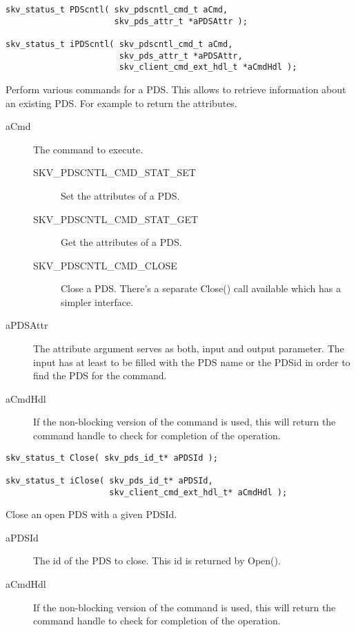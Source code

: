 \begin{lstlisting}
skv_status_t PDScntl( skv_pdscntl_cmd_t aCmd,
                      skv_pds_attr_t *aPDSAttr );

skv_status_t iPDScntl( skv_pdscntl_cmd_t aCmd,
                       skv_pds_attr_t *aPDSAttr,
                       skv_client_cmd_ext_hdl_t *aCmdHdl );
\end{lstlisting}

Perform various commands for a PDS.  This allows to retrieve
information about an existing PDS.  For example to return the
attributes.
\begin{description}
\item[aCmd] The command to execute.
  \begin{description}
    \item[\tiny SKV\_PDSCNTL\_CMD\_STAT\_SET] Set the attributes of a
      PDS.
    \item[\tiny SKV\_PDSCNTL\_CMD\_STAT\_GET] Get the attributes of a
      PDS.
    \item[\tiny SKV\_PDSCNTL\_CMD\_CLOSE] Close a PDS.  There's a
      separate Close() call available which has a simpler interface.
  \end{description}

\item[aPDSAttr] The attribute argument serves as both, input and
  output parameter.  The input has at least to be filled with the PDS
  name or the PDSid in order to find the PDS for the command.

\item[aCmdHdl] If the non-blocking version of the command is used,
  this will return the command handle to check for completion of the
  operation.
\end{description}


\begin{lstlisting}
skv_status_t Close( skv_pds_id_t* aPDSId );

skv_status_t iClose( skv_pds_id_t* aPDSId,
                     skv_client_cmd_ext_hdl_t* aCmdHdl );
\end{lstlisting}

Close an open PDS with a given PDSId.
\begin{description}
\item[aPDSId] The id of the PDS to close.  This id is returned by Open().
\item[aCmdHdl] If the non-blocking version of the command is used,
  this will return the command handle to check for completion of the
  operation.
\end{description}




